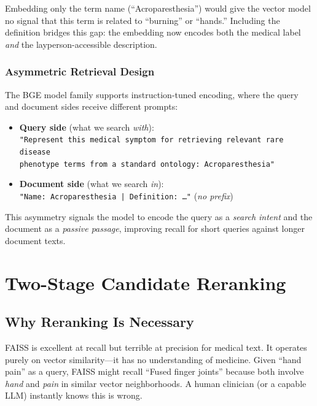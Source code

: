 \documentclass[11pt,a4paper]{article}
\begin{document}
Embedding only the term name (``Acroparesthesia'') would give the vector model no signal that this term is related to ``burning'' or ``hands.'' Including the definition bridges this gap: the embedding now encodes both the medical label \textit{and} the layperson-accessible description.

\subsubsection{Asymmetric Retrieval Design}

The BGE model family supports instruction-tuned encoding, where the query and document sides receive different prompts:

\begin{itemize}[leftmargin=*]
  \item \textbf{Query side} (what we search \textit{with}):\\
  \texttt{"Represent this medical symptom for retrieving relevant rare disease}\\\texttt{phenotype terms from a standard ontology: Acroparesthesia"}
  \item \textbf{Document side} (what we search \textit{in}):\\
  \texttt{"Name: Acroparesthesia | Definition: \ldots"} \hfill (\textit{no prefix})
\end{itemize}

This asymmetry signals the model to encode the query as a \textit{search intent} and the document as a \textit{passive passage}, improving recall for short queries against longer document texts.

\newpage

\section{Two-Stage Candidate Reranking}

\subsection{Why Reranking Is Necessary}

FAISS is excellent at recall but terrible at precision for medical text. It operates purely on vector similarity—it has no understanding of medicine. Given ``hand pain'' as a query, FAISS might recall ``Fused finger joints'' because both involve \textit{hand} and \textit{pain} in similar vector neighborhoods. A human clinician (or a capable LLM) instantly knows this is wrong.
\end{document}
